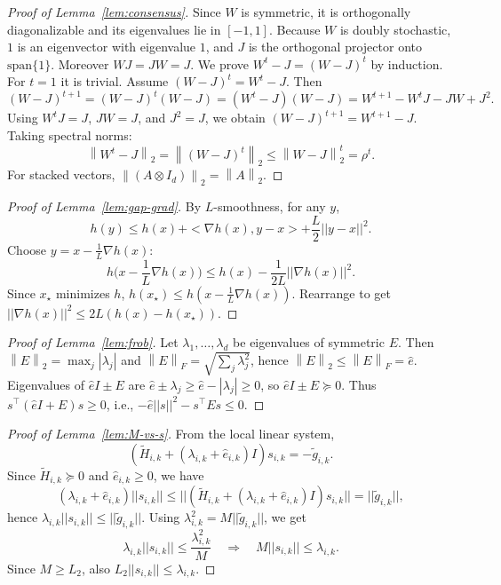 \documentclass[11pt,a4paper]{article}
\def\one{1}%
\def\J{J}%
\def\norm#1{||#1||}%
\def\ip#1#2{<#1,#2>}%
\newcommand{\one}{\mathbf{1}}
\newcommand{\ip}[2]{\left\langle #1,#2\right\rangle}
\newcommand{\norm}[1]{\left\|#1\right\|}
\newcommand{\normtwo}[1]{\left\|#1\right\|_2}
\newcommand{\normF}[1]{\left\|#1\right\|_F}
\newcommand{\J}{\left(\frac{1}{N}\one\one^\top\right)}
\begin{document}
	\begin{proof}[Proof of Lemma~\ref{lem:consensus}]
		Since $W$ is symmetric, it is orthogonally diagonalizable and its eigenvalues lie in $[-1,1]$.
		Because $W$ is doubly stochastic, $\one$ is an eigenvector with eigenvalue $1$, and $\J$ is the orthogonal projector onto $\mathrm{span}\{\one\}$.
		Moreover $W\J=\J W=\J$.
		We prove $W^t-\J=(W-\J)^t$ by induction.
		For $t=1$ it is trivial.
		Assume $(W-\J)^t=W^t-\J$. Then
		\[
		(W-\J)^{t+1}=(W-\J)^t(W-\J)=(W^t-\J)(W-\J)=W^{t+1}-W^t\J-\J W+\J^2.
		\]
		Using $W^t\J=\J$, $\J W=\J$, and $\J^2=\J$, we obtain $(W-\J)^{t+1}=W^{t+1}-\J$.
		Taking spectral norms:
		\[
		\normtwo{W^t-\J}=\normtwo{(W-\J)^t}\le \normtwo{W-\J}^t=\rho^t.
		\]
		For stacked vectors, $\normtwo{(A\otimes I_d)}=\normtwo{A}$.
	\end{proof}
	
	\begin{proof}[Proof of Lemma~\ref{lem:gap-grad}]
		By $L$-smoothness, for any $y$,
		\[
		h(y)\le h(x)+\ip{\nabla h(x)}{y-x}+\frac{L}{2}\norm{y-x}^2.
		\]
		Choose $y=x-\frac{1}{L}\nabla h(x)$:
		\[
		h\Big(x-\frac{1}{L}\nabla h(x)\Big)\le h(x)-\frac{1}{2L}\norm{\nabla h(x)}^2.
		\]
		Since $x_\star$ minimizes $h$, $h(x_\star)\le h(x-\frac{1}{L}\nabla h(x))$.
		Rearrange to get $\norm{\nabla h(x)}^2\le 2L(h(x)-h(x_\star))$.
	\end{proof}
	
	\begin{proof}[Proof of Lemma~\ref{lem:frob}]
		Let $\lambda_1,\dots,\lambda_d$ be eigenvalues of symmetric $E$.
		Then $\normtwo{E}=\max_j|\lambda_j|$ and $\normF{E}=\sqrt{\sum_j\lambda_j^2}$, hence $\normtwo{E}\le\normF{E}=\hat e$.
		Eigenvalues of $\hat e I\pm E$ are $\hat e\pm \lambda_j\ge \hat e-|\lambda_j|\ge 0$, so $\hat e I\pm E\succeq 0$.
		Thus $s^\top(\hat e I+E)s\ge 0$, i.e., $-\hat e\norm{s}^2-s^\top E s\le 0$.
	\end{proof}
	
	\begin{proof}[Proof of Lemma~\ref{lem:M-vs-s}]
		From the local linear system,
		\[
		(\tilde H_{i,k}+(\lambda_{i,k}+\hat e_{i,k})I)s_{i,k}=-\tilde g_{i,k}.
		\]
		Since $\tilde H_{i,k}\succeq 0$ and $\hat e_{i,k}\ge 0$, we have
		\[
		(\lambda_{i,k}+\hat e_{i,k})\norm{s_{i,k}} \le \norm{(\tilde H_{i,k}+(\lambda_{i,k}+\hat e_{i,k})I)s_{i,k}}
		= \norm{\tilde g_{i,k}},
		\]
		hence $\lambda_{i,k}\norm{s_{i,k}}\le \norm{\tilde g_{i,k}}$.
		Using $\lambda_{i,k}^2=M\norm{\tilde g_{i,k}}$, we get
		\[
		\lambda_{i,k}\norm{s_{i,k}}\le \frac{\lambda_{i,k}^2}{M}
		\quad\Longrightarrow\quad
		M\norm{s_{i,k}}\le \lambda_{i,k}.
		\]
		Since $M\ge L_2$, also $L_2\norm{s_{i,k}}\le \lambda_{i,k}$.
	\end{proof}
	
\end{document}
